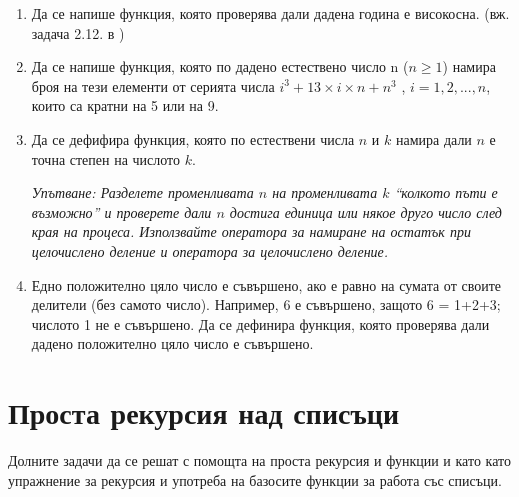 \begin{enumerate}[]
  \item Да се напише функция, която проверява дали дадена година е високосна. (вж. задача 2.12. в \cite{sbornik})
  
  \item Да се напише функция, която по дадено естествено число n ($n \geq 1$) намира броя на тези елементи от серията числа $i^3 + 13 \times i \times n + n^3$ , $i = 1, 2, ..., n$, които са кратни на 5 или на 9.

  \item Да се дефифира функция, която по естествени числа $n$ и $k$ намира дали $n$ е точна степен на числото $k$.

  \textit{Упътване: Разделете променливата $n$ на променливата $k$ ``колкото пъти е възможно'' и проверете дали $n$ достига единица или някое друго число след края на процеса. Използвайте оператора за намиране на остатък при целочислено деление и оператора за целочислено деление.}

  \item Едно положително цяло число е съвършено, ако е равно на сумата от своите делители (без самото число). Например, 6 е съвършено, защото 6 = 1+2+3; числото 1 не е съвършено. Да се дефинира функция, която проверява дали дадено положително цяло число е съвършено.

\end{enumerate}

  \section {Проста рекурсия над списъци}

  \begin{mdframed}[hidealllines=true,backgroundcolor=gray!20]
	Долните задачи да се решат с помощта на проста рекурсия и функции и като  като упражнение за рекурсия и употреба на базосите функции за работа със списъци.
  \end{mdframed}


